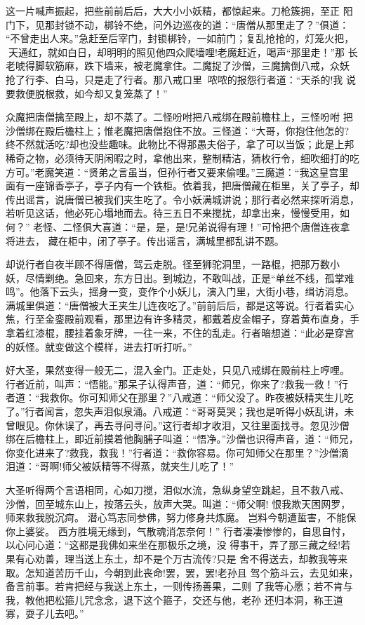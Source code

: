 这一片喊声振起，把些前前后后，大大小小妖精，都惊起来。刀枪簇拥，至正
阳门下，见那封锁不动，梆铃不绝，问外边巡夜的道：“唐僧从那里走了？”俱道：
“不曾走出人来。”急赶至后宰门，封锁梆铃，一如前门；复乱抢抢的，灯笼火把，
天通红，就如白日，却明明的照见他四众爬墙哩!老魔赶近，喝声“那里走！”那
长老唬得脚软筋麻，跌下墙来，被老魔拿住。二魔捉了沙僧，三魔擒倒八戒，众妖
抢了行李、白马，只是走了行者。那八戒口里哝哝的报怨行者道：“天杀的!我
说要救便脱根救，如今却又复笼蒸了！”

众魔把唐僧擒至殿上，却不蒸了。二怪吩咐把八戒绑在殿前檐柱上，三怪吩咐
把沙僧绑在殿后檐柱上；惟老魔把唐僧抱住不放。三怪道：“大哥，你抱住他怎的?
终不然就活吃?却也没些趣味。此物比不得那愚夫俗子，拿了可以当饭；此是上邦
稀奇之物，必须待天阴闲暇之时，拿他出来，整制精洁，猜枚行令，细吹细打的吃
方可。”老魔笑道：“贤弟之言虽当，但孙行者又要来偷哩。”三魔道：“我这皇宫里
面有一座锦香亭子，亭子内有一个铁柜。依着我，把唐僧藏在柜里，关了亭子，却
传出谣言，说唐僧已被我们夹生吃了。令小妖满城讲说；那行者必然来探听消息，
若听见这话，他必死心塌地而去。待三五日不来搅扰，却拿出来，慢慢受用，如何？”
老怪、二怪俱大喜道：“是，是，是!兄弟说得有理！”可怜把个唐僧连夜拿将进去，
藏在柜中，闭了亭子。传出谣言，满城里都乱讲不题。

却说行者自夜半顾不得唐僧，驾云走脱。径至狮驼洞里，一路棍，把那万数小
妖，尽情剿绝。急回来，东方日出。到城边，不敢叫战，正是“单丝不线，孤掌难
鸣”。他落下云头，摇身一变，变作个小妖儿，演入门里，大街小巷，缉访消息。
满城里俱道：“唐僧被大王夹生儿连夜吃了。”前前后后，都是这等说。行者着实心
焦，行至金銮殿前观看，那里边有许多精灵，都戴着皮金帽子，穿着黄布直身，手
拿着红漆棍，腰挂着象牙牌，一往一来，不住的乱走。行者暗想道：“此必是穿宫
的妖怪。就变做这个模样，进去打听打听。”

好大圣，果然变得一般无二，混入金门。正走处，只见八戒绑在殿前柱上哼哩。
行者近前，叫声：“悟能。”那呆子认得声音，道：“师兄，你来了?救我一救！”行
者道：“我救你。你可知师父在那里？”八戒道：“师父没了。昨夜被妖精夹生儿吃
了。”行者闻言，忽失声泪似泉涌。八戒道：“哥哥莫哭；我也是听得小妖乱讲，未
曾眼见。你休误了，再去寻问寻问。”这行者却才收泪，又往里面找寻。忽见沙僧
绑在后檐柱上，即近前摸着他胸脯子叫道：“悟净。”沙僧也识得声音，道：“师兄，
你变化进来了?救我，救我！”行者道：“救你容易。你可知师父在那里？”沙僧滴
泪道：“哥啊!师父被妖精等不得蒸，就夹生儿吃了！”

大圣听得两个言语相同，心如刀搅，泪似水流，急纵身望空跳起，且不救八戒、
沙僧，回至城东山上，按落云头，放声大哭。叫道：“师父啊!
恨我欺天困网罗，师来救我脱沉疴。
潜心笃志同参佛，努力修身共炼魔。
岂料今朝遭蜇害，不能保你上婆娑。
西方胜境无缘到，气散魂消怎奈何！”
行者凄凄惨惨的，自思自忖，以心问心道：“这都是我佛如来坐在那极乐之境，没
得事干，弄了那三藏之经!若果有心劝善，理当送上东土，却不是个万古流传?只是
舍不得送去，却教我等来取。怎知道苦历千山，今朝到此丧命!罢，罢，罢!老孙且
驾个筋斗云，去见如来，备言前事。若肯把经与我送上东土，一则传扬善果，二则
了我等心愿；若不肯与我，教他把松箍儿咒念念，退下这个箍子，交还与他，老孙
还归本洞，称王道寡，耍子儿去吧。”

